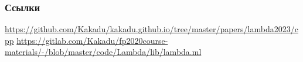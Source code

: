 \documentclass[aspectratio=169
  , xcolor={svgnames}
  , hyperref=
      { colorlinks
      , urlcolor=DarkBlue
      }
  , russian  %
  ]{beamer}
\begin{document}
\begin{frame}%
\frametitle<presentation>{Ссылки}
\begin{thebibliography}{10}
  \url{https://github.com/Kakadu/kakadu.github.io/tree/master/papers/lambda2023/cpp}
 \url{https://gitlab.com/Kakadu/fp2020course-materials/-/blob/master/code/Lambda/lib/lambda.ml}
\end{thebibliography}
\end{frame}
\end{document}
